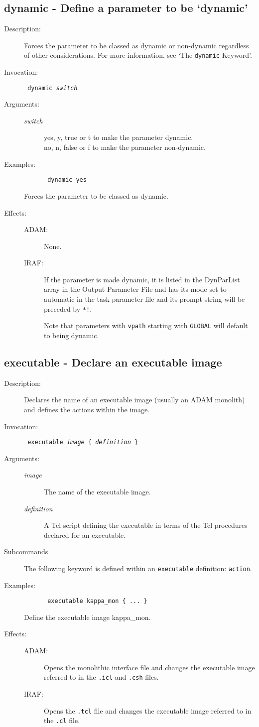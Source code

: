 \documentclass[twoside,11pt]{article}
\newcommand{\htmlref}[2]{#1}
\newcommand{\xlabel}[1]{}
\newlength{\sstbannerlength}
\newlength{\sstcaptionlength}
\newlength{\sstexampleslength}
\newlength{\sstexampleswidth}
\newcommand{\sstroutine}[3]{
   \goodbreak
   \rule{\textwidth}{0.5mm}
   \vspace{-7ex}
   \newline
   \settowidth{\sstbannerlength}{{\Large {\bf #1}}}
   \setlength{\sstcaptionlength}{\textwidth}
   \setlength{\sstexampleslength}{\textwidth}
   \addtolength{\sstbannerlength}{0.5em}
   \addtolength{\sstcaptionlength}{-2.0\sstbannerlength}
   \addtolength{\sstcaptionlength}{-5.0pt}
   \settowidth{\sstexampleswidth}{{\bf Examples:}}
   \addtolength{\sstexampleslength}{-\sstexampleswidth}
   \parbox[t]{\sstbannerlength}{\flushleft{\Large {\bf #1}}}
   \parbox[t]{\sstcaptionlength}{\center{\Large #2}}
   \parbox[t]{\sstbannerlength}{\flushright{\Large {\bf #1}}}
   \begin{description}
      #3
   \end{description}
}
\newcommand{\sstdescription}[1]{\item[Description:] #1}
\newcommand{\sstinvocation}[1]{\item[Invocation:]\hspace{0.4em}{\tt #1}}
\newcommand{\ssteffects}[1]{
   \item[Effects:] \mbox{} \\
   \vspace{-3.5ex}
   \begin{description}
      #1
   \end{description}
}
\newcommand{\sstarguments}[1]{
   \item[Arguments:] \mbox{} \\
   \vspace{-3.5ex}
   \begin{description}
      #1
   \end{description}
}
\newcommand{\sstexamples}[1]{
   \item[Examples:] \mbox{}
      #1
}
\newcommand{\sstsubsection}[1]{ \item[{#1}] \mbox{} \\}
\newcommand{\sstexamplesubsection}[2]
{   \vspace{-5ex}
\begin{quote} \texttt{\begin{tabbing}
xxx\=xxx\=\kill
#1
\end{tabbing}}
\end{quote}
#2}
\newcommand{\sstdiytopic}[2]{\item[{\hspace{-0.35em}#1\hspace{-0.35em}:}] \mbox{} \\[1.3ex] #2}
\newcommand{\ssttt}{\tt}
\renewcommand{\sstroutine}[3]{
      \subsection{#1\xlabel{#1}-\label{#1}#2}
      \begin{description}
         #3
      \end{description}
   }
\renewcommand{\sstdescription}[1]{\item[Description:]
      \begin{description}
         #1
      \end{description}
   }
\renewcommand{\sstinvocation}[1]{\item[Invocation:]
      \begin{description}
         {\ssttt #1}
      \end{description}
   }
\renewcommand{\ssteffects}[1]{
      \item[Effects:]
      \begin{description}
         #1
      \end{description}
   }
\renewcommand{\sstarguments}[1]{
      \item[Arguments:]
      \begin{description}
         #1
      \end{description}
   }
\renewcommand{\sstexamples}[1]{
      \item[Examples:]
      \begin{description}
         #1
      \end{description}
   }
\renewcommand{\sstsubsection}[1]{\item[{#1}]}
\renewcommand{\sstexamplesubsection}[2]{\item[] {\ssttt #1} \\ \item[#2]}
\renewcommand{\sstdiytopic}[2]{\item[{#1}]
      \begin{description}
         #2
      \end{description}
   }
\begin{document}
\sstroutine{
   dynamic
}{
   Define a parameter to be `dynamic'
}{
   \sstdescription{
      Forces the parameter to be classed as dynamic or non-dynamic regardless
      of other considerations. For more information, see
\htmlref{`The \texttt{dynamic} Keyword'}{dynamic_key}\latexonly{ (Section \ref{dynamic_key})}.
   }
   \sstinvocation{
      dynamic \textit{switch}
   }
   \sstarguments{
      \sstsubsection{
         \textit{switch}
      }{
         yes, y, true or t to make the parameter dynamic.\\
         no, n, false or f to make the parameter non-dynamic.
      }
   }
   \sstexamples{
      \sstexamplesubsection{
       dynamic yes
      }{
       Forces the parameter to be classed as dynamic.
      }
   }
   \ssteffects{
      \sstsubsection{ADAM:}{None.}
      \sstsubsection{IRAF:}{If the parameter is made dynamic, it is listed 
          in the DynParList array in the Output Parameter File and has its
          mode set to automatic in the task parameter file and its prompt
          string will be preceded by \texttt{*!}.

          Note that parameters with \texttt{vpath} starting with \texttt{GLOBAL}
          will default to being dynamic.
      }
   }
}

\sstroutine{
   executable
}{
   Declare an executable image
}{
   \sstdescription{
      Declares the name of an executable image (usually an ADAM  monolith)
      and defines the actions within the image.
   }
   \sstinvocation{
      executable \textit{image} \{ \textit{definition} \}
   }
   \sstarguments{
      \sstsubsection{
         \textit{image} 
      }{
         The name of the executable image.
      }
      \sstsubsection{
         \textit{definition}
      }
         A Tcl script defining the executable in terms of the Tcl procedures
         declared for an executable.
      }
   \sstdiytopic{Subcommands}{
      The following keyword is defined within an \texttt{executable} definition:
      \htmlref{{\ssttt action}}{action}.
   }
   \sstexamples{
      \sstexamplesubsection{
         executable kappa\_mon \{ ... \}
      }{
         Define the executable image kappa\_mon.
      }
   }
   \ssteffects{
      \sstsubsection{ADAM:}{Opens the monolithic interface file and changes
          the executable image referred to in the {\ssttt .icl} and 
          {\ssttt .csh} files.}
      \sstsubsection{IRAF:}{Opens the {\ssttt .tcl} file and changes the 
          executable image referred to in the {\ssttt .cl} file.}
   }
}
\end{document}
